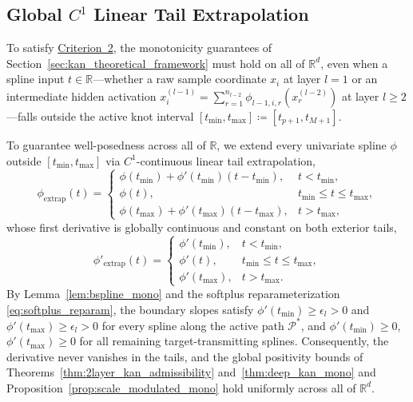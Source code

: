 \documentclass[11pt,a4paper]{article}
\theoremstyle{plain}
\theoremstyle{definition}
\theoremstyle{remark}
\begin{document}
\subsection{Global \texorpdfstring{$C^1$}{C1} Linear Tail Extrapolation}
\label{subsec:linear_extrapolation}

To satisfy \hyperref[crit:global_domain]{Criterion~2}, the monotonicity guarantees of Section~\ref{sec:kan_theoretical_framework} must hold on all of $\mathbb{R}^d$, even when a spline input $t \in \mathbb{R}$---whether a raw sample coordinate $x_i$ at layer $l=1$ or an intermediate hidden activation $x^{(l-1)}_i = \sum_{r=1}^{n_{l-2}} \phi_{l-1, i, r}(x^{(l-2)}_r)$ at layer $l \ge 2$---falls outside the active knot interval $[t_{\min}, t_{\max}] \coloneqq [t_{p+1}, t_{M+1}]$. 

To guarantee well-posedness across all of $\mathbb{R}$, we extend every univariate spline $\phi$ outside $[t_{\min}, t_{\max}]$ via $C^1$-continuous linear tail extrapolation,
\begin{equation}
    \phi_{\text{extrap}}(t) = \begin{cases}
        \phi(t_{\min}) + \phi'(t_{\min})(t - t_{\min}), & t < t_{\min}, \\
        \phi(t), & t_{\min} \le t \le t_{\max}, \\
        \phi(t_{\max}) + \phi'(t_{\max})(t - t_{\max}), & t > t_{\max},
    \end{cases}
    \label{eq:linear_extrap}
\end{equation}
whose first derivative is globally continuous and constant on both exterior tails,
\begin{equation}
    \phi'_{\text{extrap}}(t) = \begin{cases}
        \phi'(t_{\min}), & t < t_{\min}, \\
        \phi'(t), & t_{\min} \le t \le t_{\max}, \\
        \phi'(t_{\max}), & t > t_{\max}.
    \end{cases}
    \label{eq:linear_extrap_deriv}
\end{equation}
By Lemma~\ref{lem:bspline_mono} and the softplus reparameterization \eqref{eq:softplus_reparam}, the boundary slopes satisfy $\phi'(t_{\min}) \ge \epsilon_l > 0$ and $\phi'(t_{\max}) \ge \epsilon_l > 0$ for every spline along the active path $\mathcal{P}^*$, and $\phi'(t_{\min}) \ge 0$, $\phi'(t_{\max}) \ge 0$ for all remaining target-transmitting splines. Consequently, the derivative never vanishes in the tails, and the global positivity bounds of Theorems~\ref{thm:2layer_kan_admissibility} and~\ref{thm:deep_kan_mono} and Proposition~\ref{prop:scale_modulated_mono} hold uniformly across all of $\mathbb{R}^d$.
\end{document}
